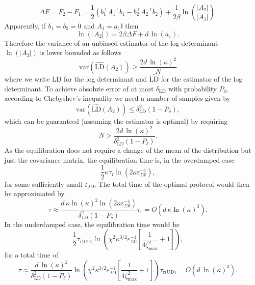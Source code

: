 \documentclass[prx,onecolumn,floatfix,longbibliography,notitlepage, nofootinbib,12pt]{revtex4-2}
\renewcommand{\geq}{\geqslant}
\renewcommand{\leq}{\leqslant}
\begin{document}
\begin{appendix}
\begin{equation}
    \Delta F = F_2 - F_1 = \frac{1}{2}(b_1^\intercal A_1^{-1}b_1-b_2^\intercal A_2^{-1}b_2) + \frac{1}{2\beta} \ln \left( \frac{\left|A_2\right|}{\left|A_1\right|}\right).
\end{equation}
Apparently, if $b_1 = b_2 = 0$ and $A_1 = a_1 \mathbb{I} $ then
\begin{equation}
    \ln\left(\left|A_2\right|\right)= 2\beta \Delta F +  d\, \ln(a_1). 
\end{equation}
Therefore the variance of an unbiased estimator of the log determinant $\ln(\left|A_2\right|)$ is lower bounded as follows
\begin{equation}
    \text{var}(\widehat{\text{LD}}(A_2)) \geq \frac{2 d\,\ln(\kappa)^2}{N}
\end{equation}
where we write $\text{LD}$ for the log determinant and $\widehat{\text{LD}}$ for the estimator of the log determinant. To achieve absolute error of at most $\delta_\text{LD}$ with probability $P_\delta$, according to Chebyshev's inequality we need a number of samples given by
\begin{equation}
    \text{var}(\widehat{\text{LD}}(A_2)) \leq \delta_\text{LD}^2 (1-P_\delta),
\end{equation}
which can be guaranteed (assuming the estimator is optimal) by requiring
\begin{equation}
    N> \frac{2 d\, \ln(\kappa)^2}{\delta^2_\text{LD}(1-P_\delta)}.
\end{equation}
As the equilibration does not require a change of the mean of the distribution but just the covariance matrix, the equilibration time is, in the overdamped case
\begin{equation}
\frac{1}{2} \kappa \tau_\text{r}\ln\left(2\kappa\varepsilon_{\Sigma 0}^{-1}\right),
\end{equation}
for some sufficiently small $\varepsilon_{\Sigma 0}$. The total time of the optimal protocol would then be approximated by
\begin{equation}
\tau \approx \frac{ d\, \kappa \ln(\kappa)^2\ln(2 \kappa\varepsilon^{-1}_{\Sigma0})}{\delta^2_\text{LD}(1-P_\delta)} \tau_\text{r} = O(d \, \kappa \ln(\kappa)^3).
\end{equation}
In the underdamped case, the equilibration time would be
\begin{equation}
\frac{1}{2} \tau_\text{r(UD)}\ln\left(\chi^2 \kappa^{3/2}\varepsilon_{\Sigma0}^{-1}\left[\frac{1}{4\zeta_\text{max}^{2}}+1\right]\right),
\end{equation}
for a total time of
\begin{equation}
\tau \approx \frac{ d\,\ln(\kappa)^2}{\delta^2_\text{LD}(1-P_\delta)} \ln\left(\chi^2 \kappa^{3/2}\varepsilon_{\Sigma0}^{-1}\left[\frac{1}{4\zeta_\text{max}^{2}}+1\right]\right)
\tau_\text{r(UD)} = O(d \, \ln(\kappa)^3).
\end{equation}





\end{appendix}
\end{document}
